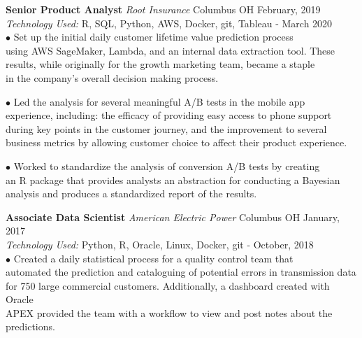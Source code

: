 \documentclass[12pt]{article}
\newcommand\tab[1][1cm]{\hspace*{#1}}
\begin{document}
\begin{flushleft}
    \textbf{Senior Product Analyst} \tab[.25cm] \textit{Root Insurance} \tab[.15cm] \small{Columbus OH}  \hfill \small{February, 2019} \\
    \tab[0.5cm] \textit{Technology Used:} R, SQL, Python, AWS, Docker, git, Tableau \hfill \small{{-} March 2020} \\

    \tab $\bullet$ Set up the initial daily customer lifetime value prediction process \\
    \tab[1.25cm] using AWS SageMaker, Lambda, and an internal data extraction tool. These \\
    \tab[1.25cm] results, while originally for the growth marketing team, became a staple \\
    \tab[1.25cm] in the company's overall decision making process.
    \vspace*{0.5mm}

    \tab $\bullet$ Led the analysis for several meaningful A/B tests in the mobile app \\
    \tab[1.25cm] experience, including: the efficacy of providing easy access to phone support \\
    \tab[1.25cm] during key points in the customer journey, and the improvement to several \\
    \tab[1.25cm] business metrics by allowing customer choice to affect their product experience. \\
    \vspace*{0.5mm}

    \tab $\bullet$ Worked to standardize the analysis of conversion A/B tests by creating \\
    \tab[1.25cm] an R package that provides analysts an abstraction for conducting a Bayesian \\
    \tab[1.25cm] analysis and produces a standardized report of the results. \\
    \medskip

    \textbf{Associate Data Scientist} \tab[.25cm] \textit{American Electric Power} \tab[.15cm] \small{Columbus OH} \hfill {January, 2017} \\
    \tab[0.5cm] \textit{Technology Used:} Python, R, Oracle, Linux, Docker, git \hfill \small{{-} October, 2018} \\

    \tab $\bullet$ Created a daily statistical process for a quality control team that \\
    \tab[1.25cm] automated the prediction and cataloguing of potential errors in transmission data \\
    \tab[1.25cm] for 750 large commercial customers. Additionally, a dashboard created with Oracle \\
    \tab[1.25cm] APEX provided the team with a workflow to view and post notes about the predictions. \\
    \vspace*{0.5mm}


\end{flushleft}
\end{document}
